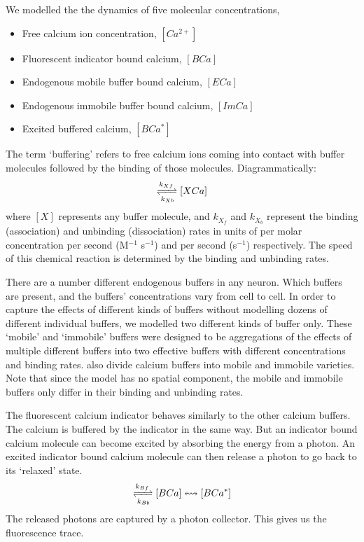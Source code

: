 We modelled the the dynamics of five molecular concentrations,
\begin{itemize}
    \item Free calcium ion concentration, $[Ca^{2+}]$
    \item Fluorescent indicator bound calcium, $[BCa]$
    \item Endogenous mobile buffer bound calcium, $[ECa]$
    \item Endogenous immobile buffer bound calcium, $[ImCa]$
    \item Excited buffered calcium, $[BCa^{\ast}]$
\end{itemize}
The term ‘buffering’ refers to free calcium ions coming into contact with buffer molecules followed by the binding of those molecules. Diagrammatically:
\begin{align*}
    [X][Ca^{2+}] \xrightleftharpoons[k_{Xb}]{k_{Xf}} [XCa]
\end{align*}
where $[X]$ represents any buffer molecule, and $k_{X_f}$ and $k_{X_b}$ represent the binding (association) and unbinding (dissociation) rates in units of per molar concentration per second (M$^{-1}$ s$^{-1}$) and per second (s$^{-1}$) respectively. The speed of this chemical reaction is determined by the binding and unbinding rates.

There are a number different endogenous buffers in any neuron. Which buffers are present, and the buffers’ concentrations vary from cell to cell. In order to capture the effects of different kinds of buffers without modelling dozens of different individual buffers, we modelled two different kinds of buffer only. These `mobile' and `immobile' buffers were designed to be aggregations of the effects of multiple different buffers into two effective buffers with different concentrations and binding rates. \parencite{bartol} also divide calcium buffers into mobile and immobile varieties. Note that since the model has no spatial component, the mobile and immobile buffers only differ in their binding and unbinding rates.

The fluorescent calcium indicator behaves similarly to the other calcium buffers. The calcium is buffered by the indicator in the same way. But an indicator bound calcium molecule can become excited by absorbing the energy from a photon. An excited indicator bound calcium molecule can then release a photon to go back to its ‘relaxed’ state.
\begin{align*}
    [B][Ca^{2+}] \xrightleftharpoons[k_{Bb}]{k_{Bf}} [BCa] \leftrightsquigarrow [BCa^{\ast}]
\end{align*}
The released photons are captured by a photon collector. This gives us the fluorescence trace.

